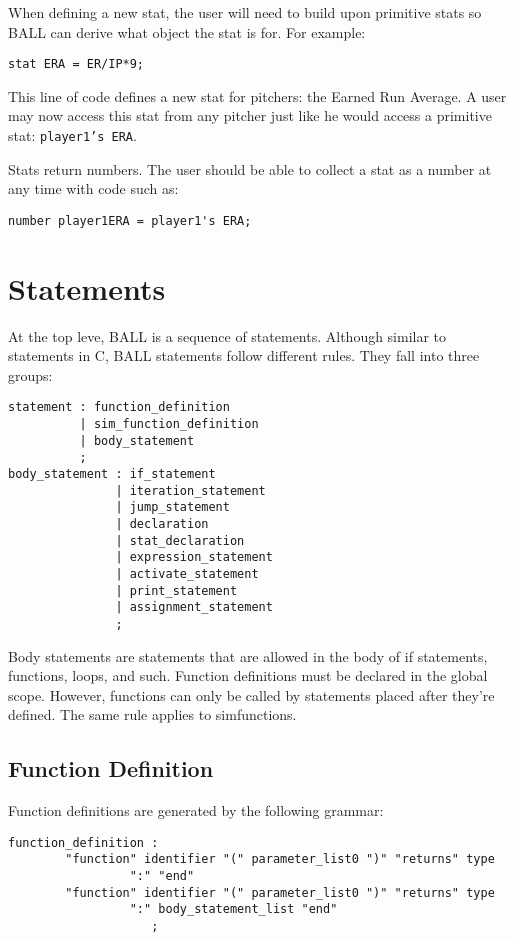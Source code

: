 When defining a new stat, the user will need to build upon primitive
stats so BALL can derive what object the stat is for. For example:

\begin{verbatim}
stat ERA = ER/IP*9;
\end{verbatim}

This line of code defines a new stat for pitchers: the Earned Run
Average. A user may now access this 
stat from any pitcher just like he would access a primitive stat:
\texttt{player1's ERA}.

Stats return numbers. The user should be able to collect a stat as
a number at any time with code such as: 

\begin{verbatim}
number player1ERA = player1's ERA;
\end{verbatim}

\section{Statements}\label{Stmts}
At the top leve, BALL is a sequence of statements. Although similar to
statements in C, BALL statements follow different rules. They fall
into three groups:

\begin{verbatim}
statement : function_definition
          | sim_function_definition
          | body_statement
          ;
body_statement : if_statement
               | iteration_statement
               | jump_statement
               | declaration
               | stat_declaration
               | expression_statement
               | activate_statement
               | print_statement
               | assignment_statement
               ;
\end{verbatim}

Body statements are statements that are allowed in the body of if
statements, functions, loops, and such. Function definitions must be
declared in the global scope. However, functions can only be called by
statements placed after they're defined. The same rule applies to
simfunctions.

\subsection{Function Definition}\label{FuncDef}
Function definitions are generated by the following grammar:

\begin{verbatim}
function_definition : 
        "function" identifier "(" parameter_list0 ")" "returns" type
                 ":" "end"
        "function" identifier "(" parameter_list0 ")" "returns" type
                 ":" body_statement_list "end"
                    ;
\end{verbatim}

